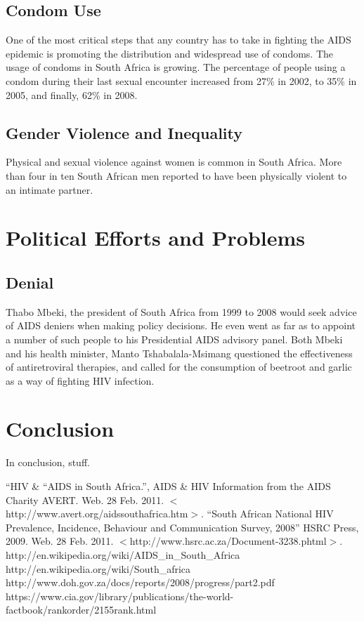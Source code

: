 \documentclass[12pt]{report}
\begin{document}
\subsection{Condom Use}
One of the most critical steps that any country has to take in fighting the AIDS epidemic is promoting the distribution and widespread use of condoms.
The usage of condoms in South Africa is growing.  The percentage of people using a condom during their last sexual encounter increased from 27\% in 2002, to 35\% in 2005, and finally, 62\% in 2008\cite{shisana}.

\subsection{Gender Violence and Inequality}
Physical and sexual violence against women is common in South Africa. 
More than four in ten South African men reported to have been physically violent to an intimate partner.

\section{Political Efforts and Problems}
\subsection{Denial}
Thabo Mbeki, the president of South Africa from 1999 to 2008 would seek advice of AIDS deniers when making policy decisions.  
He even went as far as to appoint a number of such people to his Presidential AIDS advisory panel.  
Both Mbeki and his health minister, Manto Tshabalala-Msimang questioned the effectiveness of antiretroviral therapies, and called for the consumption of beetroot and garlic as a way of fighting HIV infection.

\section{Conclusion}
In conclusion, stuff.
\begin{thebibliography}{99}
    ``HIV \& ``AIDS in South Africa.'',
        AIDS \& HIV Information from the AIDS Charity AVERT. Web. 28 Feb. 2011. $<$http://www.avert.org/aidssouthafrica.htm$>$.
    ``South African National HIV Prevalence, Incidence, Behaviour and Communication Survey, 2008''
        HSRC Press, 2009. Web. 28 Feb. 2011. $<$http://www.hsrc.ac.za/Document-3238.phtml$>$. 
    http://en.wikipedia.org/wiki/AIDS\_in\_South\_Africa
    http://en.wikipedia.org/wiki/South\_africa
    http://www.doh.gov.za/docs/reports/2008/progress/part2.pdf
    https://www.cia.gov/library/publications/the-world-factbook/rankorder/2155rank.html
\end{thebibliography}
\end{document}
